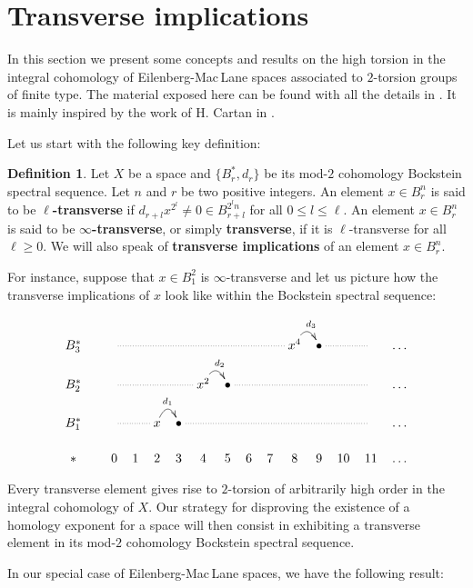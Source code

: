 \documentclass{amsart}
\theoremstyle{definition}
\newtheorem*{defn*}{Definition}
\theoremstyle{remark}
\renewcommand{\geq}{\geqslant}
\renewcommand{\leq}{\leqslant}
\begin{document}
\section{Transverse implications}\label{s:transverse}

In this section we present some concepts and results on the high torsion in the integral cohomology of Eilenberg-Mac\,Lane spaces associated to $2$-torsion groups of finite type. The material exposed here can be found with all the details in \cite{Cl02}. It is mainly inspired by the work of H. Cartan in \cite{Ca55}.

Let us start with the following key definition:

\begin{defn*}
Let $X$ be a space and $\{B^*_r,d_r\}$ be its mod-$2$ cohomology Bockstein spectral sequence. Let $n$ and $r$ be two positive integers. An element $x\in B^n_r$ is said to be {\bf $\ell$-transverse} if $d_{r+l}x^{2^l}\not=0\in B^{2^l n}_{r+l}$ for all $0\leq l\leq\ell$. An element $x\in B^n_r$ is said to be {\bf $\infty$-transverse}, or simply {\bf transverse}, if it is $\ell$-transverse for all $\ell\geq0$. We will also speak of {\bf transverse implications} of an element $x\in B^n_r$.
\end{defn*}

For instance, suppose that $x\in B_1^2$ is $\infty$-transverse and let us picture how the transverse implications of $x$ look like within the Bockstein spectral sequence:

$$\xymatrix@C=0.2cm@R=0.5truecm{
B_3^* &&\ar@{.}[rrrrrrrr] & & & & & & & &x^4\ar@/^0.4truecm/[r]^-{d_3} &\bullet\ar@{.}[rr] & &  &\dots\\
B_2^* &&\ar@{.}[rrrr] & & & &x^2\ar@/^0.4truecm/[r]^-{d_2} &\bullet\ar@{.}[rrrrrr] & & & & & &  &\dots\\
B_1^* &&\ar@{.}[rr] & &x\ar@/^0.4truecm/[r]^-{d_1} &\bullet\ar@{.}[rrrrrrrr] & & & & & & & & &\dots\\
{*}&&0 &1 &2 &3 &4 &5 &6 &7 &8 &9 &10 &11 &\dots
}$$

Every transverse element gives rise to $2$-torsion of arbitrarily high order in the integral cohomology of $X$. Our strategy for disproving the existence of a homology exponent for a space will then consist in exhibiting a transverse element in its mod-$2$ cohomology Bockstein spectral sequence. 

In our special case of Eilenberg-Mac\,Lane spaces, we have the following result:
\end{document}
